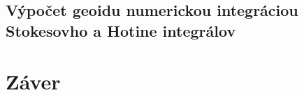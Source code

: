 \documentclass[a4paper, 12pt]{book}
\begin{document}

\section{Výpočet geoidu numerickou integráciou Stokesovho a Hotine integrálov}







\chapter*{Záver}









\end{document}
